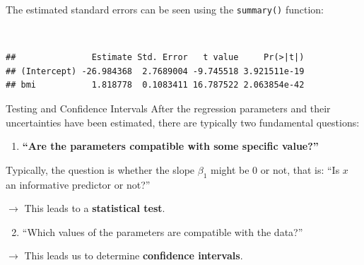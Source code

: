 \documentclass[
  10pt,
  ignorenonframetext,
]{beamer}
\newenvironment{Shaded}{\begin{snugshade}}{\end{snugshade}}
\newcommand{\FunctionTok}[1]{\textcolor[rgb]{0.13,0.29,0.53}{\textbf{#1}}}
\newcommand{\NormalTok}[1]{#1}
\newcommand{\SpecialCharTok}[1]{\textcolor[rgb]{0.81,0.36,0.00}{\textbf{#1}}}
\providecommand{\tightlist}{%
  \setlength{\itemsep}{0pt}\setlength{\parskip}{0pt}}
\begin{document}
\begin{frame}[fragile]
The estimated standard errors can be seen using the \texttt{summary()}
function:

\(~\)

\scriptsize

\begin{Shaded}
\end{Shaded}

\begin{verbatim}
##               Estimate Std. Error   t value     Pr(>|t|)
## (Intercept) -26.984368  2.7689004 -9.745518 3.921511e-19
## bmi           1.818778  0.1083411 16.787522 2.063854e-42
\end{verbatim}
\end{frame}

\begin{frame}{Testing and Confidence Intervals}
\protect\hypertarget{testing-and-confidence-intervals}{}
After the regression parameters and their uncertainties have been
estimated, there are typically two fundamental questions:

\vspace{4mm}

\begin{enumerate}
\tightlist
\item
  \textbf{``Are the parameters compatible with some specific value?''}
\end{enumerate}

Typically, the question is whether the slope \(\beta_1\) might be 0 or
not, that is: ``Is \(x\) an informative predictor or not?''

\hspace{4mm} \(\rightarrow\) This leads to a \textbf{statistical test}.

\vspace{6mm}

\begin{enumerate}
\setcounter{enumi}{1}
\tightlist
\item
  ``Which values of the parameters are compatible with the data?''
\end{enumerate}

\hspace{4mm} \(\rightarrow\) This leads us to determine
\textbf{confidence intervals}.
\end{frame}
\end{document}
